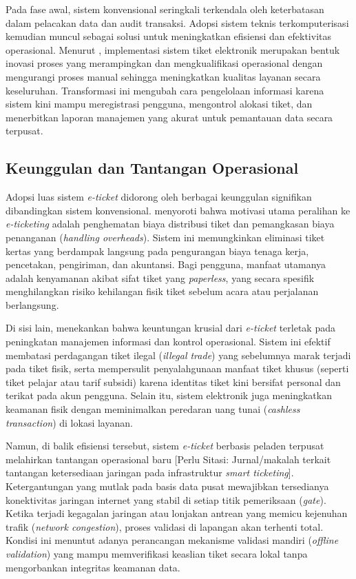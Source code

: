 Pada fase awal, sistem konvensional seringkali terkendala oleh keterbatasan dalam pelacakan data dan audit transaksi. Adopsi sistem teknis terkomputerisasi kemudian muncul sebagai solusi untuk meningkatkan efisiensi dan efektivitas operasional. Menurut \textcite{lubeck2012electronic}, implementasi sistem tiket elektronik merupakan bentuk inovasi proses yang merampingkan dan mengkualifikasi operasional dengan mengurangi proses manual sehingga meningkatkan kualitas layanan secara keseluruhan. Transformasi ini mengubah cara pengelolaan informasi karena sistem kini mampu meregistrasi pengguna, mengontrol alokasi tiket, dan menerbitkan laporan manajemen yang akurat untuk pemantauan data secara terpusat.

\subsection{Keunggulan dan Tantangan Operasional}
Adopsi luas sistem \textit{e-ticket} didorong oleh berbagai keunggulan signifikan dibandingkan sistem konvensional. \textcite{chen2007passenger} menyoroti bahwa motivasi utama peralihan ke \textit{e-ticketing} adalah penghematan biaya distribusi tiket dan pemangkasan biaya penanganan (\textit{handling overheads}). Sistem ini memungkinkan eliminasi tiket kertas yang berdampak langsung pada pengurangan biaya tenaga kerja, pencetakan, pengiriman, dan akuntansi. Bagi pengguna, manfaat utamanya adalah kenyamanan akibat sifat tiket yang \textit{paperless}, yang secara spesifik menghilangkan risiko kehilangan fisik tiket sebelum acara atau perjalanan berlangsung.

Di sisi lain, \textcite{lubeck2012electronic} menekankan bahwa keuntungan krusial dari \textit{e-ticket} terletak pada peningkatan manajemen informasi dan kontrol operasional. Sistem ini efektif membatasi perdagangan tiket ilegal (\textit{illegal trade}) yang sebelumnya marak terjadi pada tiket fisik, serta mempersulit penyalahgunaan manfaat tiket khusus (seperti tiket pelajar atau tarif subsidi) karena identitas tiket kini bersifat personal dan terikat pada akun pengguna. Selain itu, sistem elektronik juga meningkatkan keamanan fisik dengan meminimalkan peredaran uang tunai (\textit{cashless transaction}) di lokasi layanan.

Namun, di balik efisiensi tersebut, sistem \textit{e-ticket} berbasis peladen terpusat melahirkan tantangan operasional baru [Perlu Sitasi: Jurnal/makalah terkait tantangan ketersediaan jaringan pada infrastruktur \textit{smart ticketing}]. Ketergantungan yang mutlak pada basis data pusat mewajibkan tersedianya konektivitas jaringan internet yang stabil di setiap titik pemeriksaan (\textit{gate}). Ketika terjadi kegagalan jaringan atau lonjakan antrean yang memicu kejenuhan trafik (\textit{network congestion}), proses validasi di lapangan akan terhenti total. Kondisi ini menuntut adanya perancangan mekanisme validasi mandiri (\textit{offline validation}) yang mampu memverifikasi keaslian tiket secara lokal tanpa mengorbankan integritas keamanan data.

